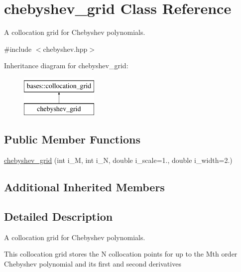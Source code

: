 \hypertarget{classchebyshev__grid}{\section{chebyshev\-\_\-grid Class Reference}
\label{classchebyshev__grid}
}


A collocation grid for Chebyshev polynomials.  




{\ttfamily \#include $<$chebyshev.\-hpp$>$}

Inheritance diagram for chebyshev\-\_\-grid\-:\begin{figure}[H]
\begin{center}
\leavevmode
\includegraphics[height=2.000000cm]{classchebyshev__grid}
\end{center}
\end{figure}
\subsection*{Public Member Functions}
\begin{DoxyCompactItemize}
\item 
\hyperlink{classchebyshev__grid_ae37600b568e7d1e864b5ec10e6775c2d}{chebyshev\-\_\-grid} (int i\-\_\-\-M, int i\-\_\-\-N, double i\-\_\-scale=1., double i\-\_\-width=2.)
\end{DoxyCompactItemize}
\subsection*{Additional Inherited Members}


\subsection{Detailed Description}
A collocation grid for Chebyshev polynomials. 



 This collocation grid stores the N collocation points for up to the Mth order Chebyshev polynomial and its first and second derivatives 

